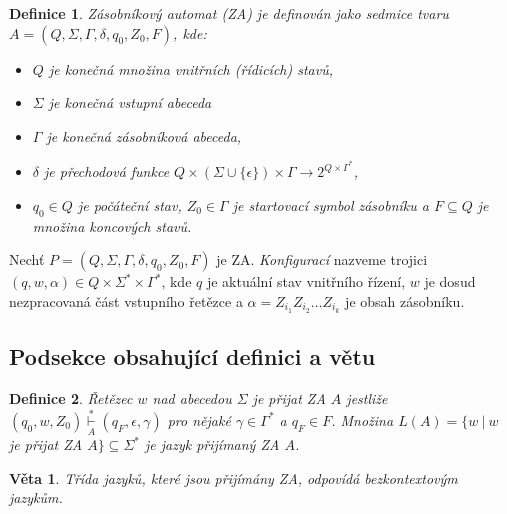 \documentclass[a4paper, 11pt, twocolumn]{article}
\newtheorem{definice}{Definice}
\newtheorem{veta}{Věta}
\begin{document}
    \begin{definice} \label{def1}
        \textup{Zásobníkový automat} (ZA) je definován jako
        sedmice tvaru $ A= (Q, \Sigma, \Gamma, \delta, q_0, Z_0, F)$, kde:
    \begin{itemize}
        \item $Q$ je konečná množina \textup{vnitřních (řídicích) stavů,}
        \item $\Sigma$ je konečná \textup{vstupní abeceda}
        \item $\Gamma$ je konečná \textup{zásobníková abeceda,}
        \item $\delta$ je \textup{přechodová funkce} $Q\times(\Sigma\cup\{\epsilon\})\times\Gamma \rightarrow 2^{Q\times\Gamma^\ast}$,
        \item $q_0 \in Q$ je \textup{počáteční stav}, $Z_0 \in \Gamma$ je \textup{startovací symbol zásobníku} a $F \subseteq Q$ je množina \textup{koncových stavů}.
    \end{itemize}
    \end{definice}

    Nechť $P = (Q, \Sigma, \Gamma, \delta, q_0, Z_0, F)$ je ZA. \textit{Konfigurací} nazveme trojici $(q, w, \alpha) \in Q \times \Sigma^* \times \Gamma^*$, kde $q$ je aktuální stav vnitřního řízení, $w$ je dosud nezpracovaná část vstupního řetězce a $\alpha = Z_{i_1}Z_{i_2} \dots Z_{i_k}$ je obsah zásobníku.
 
    \subsection{Podsekce obsahující definici a větu}
        \begin{definice} \label{def2}
            \textup{Řetězec $w$ nad abecedou $\Sigma$ je přijat ZA} $A$ jest\-liže $(q_0, w, Z_0) \underset{A}{\stackrel{\ast}{\vdash}} (q_F, \epsilon, \gamma)$ pro nějaké $\gamma \in \Gamma^\ast$ a $q_F \in F$. Množina $L(A) = \{w\ |\ w$ je přijat ZA $A \} \subseteq \Sigma^\ast$ je \textup{jazyk přijímaný ZA} $A$.
        \end{definice}
        \begin{veta}
            Třída jazyků, které jsou přijímány ZA, odpovídá \textup{bezkontextovým jazykům.}
        \end{veta}
        
\end{document}
